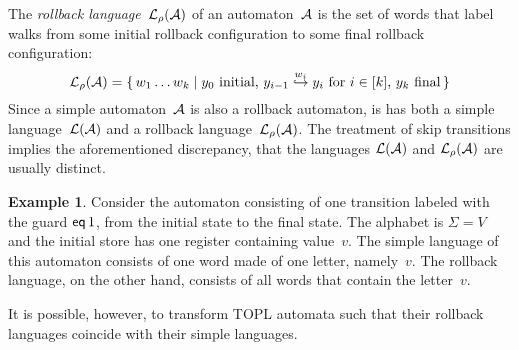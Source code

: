 \documentclass{article} %
\newcommand{\eoe}{\hskip5mm\null\nobreak\hfill\vrule height1ex width1ex}
\theoremstyle{definition}
\newtheorem{example}{Example}
\theoremstyle{remark}
\begin{document}
The \emph{rollback language}~${\cal L}_\rho({\cal A})$ of an automaton~${\cal A}$ is the set of words that label walks from some initial rollback configuration to some final rollback configuration:
\[
{\cal L}_\rho({\cal A})=
  \{\,w_1\ldots w_k\mid
    \text{$y_0$~initial,
    $y_{i-1}\stackrel{w_i}\hookrightarrow y_i$ for $i\in[k]$,
    $y_k$~final}\,\}
\]
Since a simple automaton~${\cal A}$ is also a rollback automaton, is has both a simple language~${\cal L}({\cal A})$ and a rollback language~${\cal L}_\rho({\cal A})$.
The treatment of skip transitions implies the aforementioned
discrepancy, that the languages ${\cal L}({\cal A})$ and ${\cal L}_\rho({\cal A})$ are usually distinct.

\begin{example}
Consider the automaton consisting of one transition labeled with the guard ${\sf eq}\,1$, from the initial state to the final state.
The alphabet is $\Sigma=V$ and the initial store has one register containing value~$v$.
The simple language of this automaton consists of one word made of one letter, namely~$v$.
The rollback language, on the other hand, consists of all words that contain the letter~$v$.
\eoe
\end{example}

It is possible, however, to transform TOPL automata such that their rollback languages coincide with their simple languages.
\end{document}
